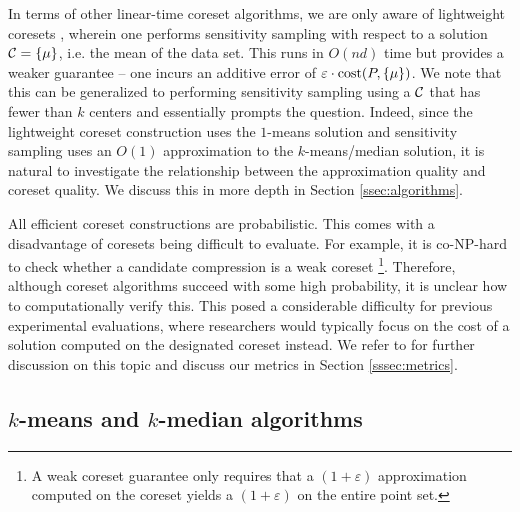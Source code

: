 In terms of other linear-time coreset algorithms, we are only aware of lightweight coresets \cite{BachemL018}, wherein one performs sensitivity sampling with
respect to a solution $\mathcal C=\{\mu\}$, i.e. the mean of the data set. This runs in $O(nd)$ time but provides a weaker guarantee -- one incurs an additive error of $\varepsilon\cdot \operatorname{cost}(P,\{\mu\})$.
We note that this can be generalized to performing sensitivity sampling using a $\mathcal C$ that has fewer than $k$ centers and essentially prompts the question.
Indeed, since the lightweight coreset construction uses the $1$-means solution and sensitivity sampling uses an $O(1)$ approximation to the $k$-means/median
solution, it is natural to investigate the relationship between the approximation quality and coreset quality. We discuss this in more depth in Section
\ref{ssec:algorithms}.

All efficient coreset constructions are probabilistic. This comes with a disadvantage of coresets being difficult to evaluate. For example, it is
co-NP-hard to check whether a candidate compression is a weak coreset \cite{chrisESA} \footnote{A weak coreset guarantee only requires that a $(1+\varepsilon)$
approximation computed on the coreset yields a $(1+\varepsilon)$ on the entire point set.}. Therefore, although coreset algorithms succeed with some high
probability, it is unclear how to computationally verify this.  This posed a considerable difficulty for previous experimental evaluations,
where researchers would typically focus on the cost of a solution computed on the designated coreset instead. We refer to \cite{chrisESA} for further discussion
on this topic and discuss our metrics in Section \ref{sssec:metrics}.

\subsection{$k$-means and $k$-median algorithms}

